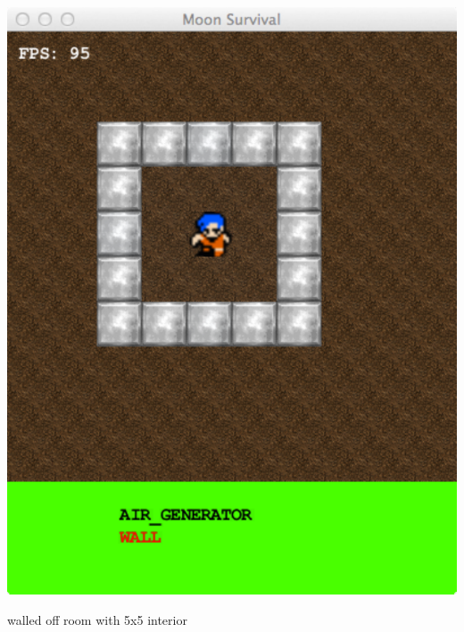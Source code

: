 \begin{marginfigure}
	\includegraphics{res/space_base_prototype/empty_room.pdf}
	\caption{
	walled off room with 5x5 interior	}
	\label{fig:SpaceBaseWithRoom}
\end{marginfigure}

